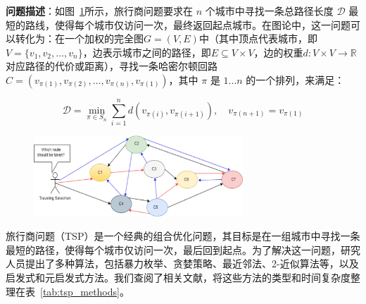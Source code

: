 \documentclass[UTF8,openany,zihao=5]{ctexbook}
\begin{document}
\textbf{问题描述}：如图~\ref{fig:tsp}所示，旅行商问题要求在 $n$ 个城市中寻找一条总路径长度 $\mathcal{D}$ 最短的路线，使得每个城市仅访问一次，最终返回起点城市。在图论中，这一问题可以转化为：在一个加权的完全图$G = (V, E)$中（其中顶点代表城市，即$V = \{v_1, v_2, \ldots, v_n\}$，边表示城市之间的路径，即$E \subseteq V \times V$，边的权重$d: V \times V \rightarrow \mathbb{R}$对应路径的代价或距离），寻找一条哈密尔顿回路$C = (v_{\pi(1)}, v_{\pi(2)}, \ldots, v_{\pi(n)}, v_{\pi(1)})$，其中 $\pi$ 是 $1...n$ 的一个排列，来满足：

\begin{equation}
\mathcal{D} = \min_{\pi \in S_n} \sum_{i=1}^{n} d(v_{\pi(i)}, v_{\pi(i+1)}), \quad v_{\pi(n+1)} = v_{\pi(1)}
\end{equation}

\begin{figure}[h]
  \begin{center}
    \includegraphics[width=0.7\textwidth]{images/tsp.jpg}
    \centering
    \label{fig:tsp}
  \end{center}
  \vspace{-3ex}
\end{figure}

旅行商问题（TSP）是一个经典的组合优化问题，其目标是在一组城市中寻找一条最短的路径，使得每个城市仅访问一次，最后回到起点。为了解决这一问题，研究人员提出了多种算法，包括暴力枚举、贪婪策略、最近邻法、2-近似算法等，以及启发式和元启发式方法。我们查阅了相关文献，将这些方法的类型和时间复杂度整理在表~\ref{tab:tsp_methods}。
\end{document}
